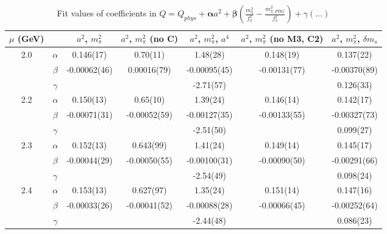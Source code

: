 \documentclass[12pt]{extarticle}
\begin{document}
\begin{table}[h!]
\begin{center}
\begin{tabular}{|c c|c|c|c|c|c|}
\hline
$\mu$ (GeV) &  & $a^2$, $m_\pi^2$& $a^2$, $m_\pi^2$ (no C)& $a^2$, $m_\pi^2$, $a^4$& $a^2$, $m_\pi^2$ (no M3, C2)& $a^2$, $m_\pi^2$, $\delta m_s$\\
\hline
\multirow{3}{0.5in}{2.0} & $\alpha$ & 0.146(17)& 0.70(11)& 1.48(28)& 0.148(19)& 0.137(22)\\
 & $\beta$ & -0.00062(46)& 0.00016(79)& -0.00095(45)& -0.00131(77)& -0.00370(89)\\
 & $\gamma$ &  &  & -2.71(57)&  & 0.126(33)\\
\hline
\multirow{3}{0.5in}{2.2} & $\alpha$ & 0.150(13)& 0.65(10)& 1.39(24)& 0.146(14)& 0.142(17)\\
 & $\beta$ & -0.00071(31)& -0.00052(59)& -0.00127(35)& -0.00133(55)& -0.00327(73)\\
 & $\gamma$ &  &  & -2.51(50)&  & 0.099(27)\\
\hline
\multirow{3}{0.5in}{2.3} & $\alpha$ & 0.152(13)& 0.643(99)& 1.41(24)& 0.149(14)& 0.145(17)\\
 & $\beta$ & -0.00044(29)& -0.00050(55)& -0.00100(31)& -0.00090(50)& -0.00291(66)\\
 & $\gamma$ &  &  & -2.54(49)&  & 0.098(24)\\
\hline
\multirow{3}{0.5in}{2.4} & $\alpha$ & 0.153(13)& 0.627(97)& 1.35(24)& 0.151(14)& 0.147(16)\\
 & $\beta$ & -0.00033(26)& -0.00041(52)& -0.00088(28)& -0.00066(45)& -0.00252(64)\\
 & $\gamma$ &  &  & -2.44(48)&  & 0.086(23)\\
\hline
\end{tabular}
\caption{Fit values of coefficients in $Q = Q_{phys} + \mathbf{\alpha} a^2 + \mathbf{\beta}\left(\frac{m_\pi^2}{f_\pi^2}-\frac{m_{\pi,PDG}^2}{f_\pi^2}\right) + \gamma(\ldots)$}
\end{center}
\end{table}




















\clearpage
\end{document}
